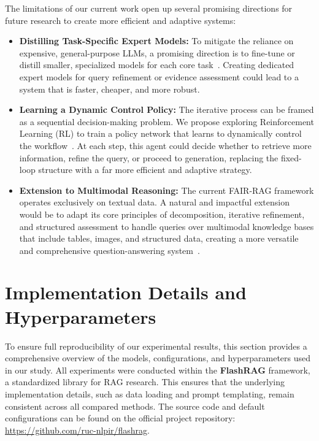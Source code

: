 \documentclass[11pt]{article}
\begin{document}
The limitations of our current work open up several promising directions for future research to create more efficient and adaptive systems:

\begin{itemize}
    \item \textbf{Distilling Task-Specific Expert Models:} To mitigate the reliance on expensive, general-purpose LLMs, a promising direction is to fine-tune or distill smaller, specialized models for each core task~\cite{hinton2015distillingknowledgeneuralnetwork}. Creating dedicated expert models for query refinement or evidence assessment could lead to a system that is faster, cheaper, and more robust.
    
    \item \textbf{Learning a Dynamic Control Policy:} The iterative process can be framed as a sequential decision-making problem. We propose exploring Reinforcement Learning (RL) to train a policy network that learns to dynamically control the workflow~\cite{schick2023toolformerlanguagemodelsteach}. At each step, this agent could decide whether to retrieve more information, refine the query, or proceed to generation, replacing the fixed-loop structure with a far more efficient and adaptive strategy.
    
    \item \textbf{Extension to Multimodal Reasoning:} The current FAIR-RAG framework operates exclusively on textual data. A natural and impactful extension would be to adapt its core principles of decomposition, iterative refinement, and structured assessment to handle queries over multimodal knowledge bases that include tables, images, and structured data, creating a more versatile and comprehensive question-answering system~\cite{alayrac2022flamingovisuallanguagemodel}.
\end{itemize}




\appendix

\section{Implementation Details and Hyperparameters}
\label{sec:appendix-implementation}

To ensure full reproducibility of our experimental results, this section provides a comprehensive overview of the models, configurations, and hyperparameters used in our study. All experiments were conducted within the \textbf{FlashRAG} framework, a standardized library for RAG research. This ensures that the underlying implementation details, such as data loading and prompt templating, remain consistent across all compared methods. The source code and default configurations can be found on the official project repository: \url{https://github.com/ruc-nlpir/flashrag}.
\end{document}
